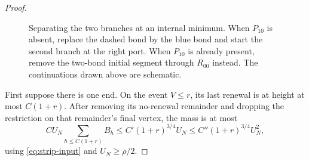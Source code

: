 \begin{proof}
\begin{figure}[ht]
\centering
{}
\caption{Separating the two branches at an internal minimum. When $P_{10}$ is absent, replace the dashed bond by the blue bond and start the second branch at the right port. When $P_{10}$ is already present, remove the two-bond initial segment through $R_{00}$ instead. The continuations drawn above are schematic.}\label{fig:minimum}
\end{figure}

First suppose there is one end. On the event $V\le r$, its last renewal is at height at most $C(1+r)$. After removing its no-renewal remainder and dropping the restriction on that remainder's final vertex, the mass is at most
\[
 C U_N\sum_{h\le C(1+r)}B_h
       \le C'(1+r)^{3/4}U_N
       \le C''(1+r)^{3/4}U_N^2,
\]
using \eqref{eq:strip-input} and $U_N\ge\rho/2$.


\end{proof}
